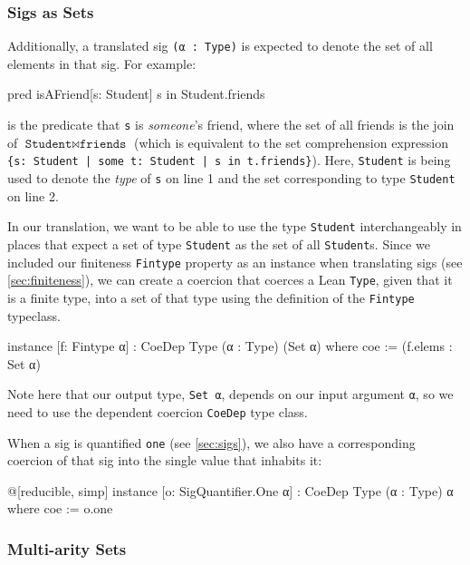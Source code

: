 \subsubsection{Sigs as Sets}

Additionally, a translated sig \texttt{(α : Type)} is expected to denote the set of all elements in that sig. For example:
\begin{forge}
pred isAFriend[s: Student] {
  s in Student.friends
}
\end{forge}
is the predicate that \texttt{s} is \emph{someone}'s friend, where the set of all friends is the join of $\texttt{Student} \bowtie \texttt{friends}$ (which is equivalent to the set comprehension expression \texttt{\{s: Student | some t: Student | s in t.friends\}}). Here, \texttt{Student} is being used to denote the \emph{type} of \texttt{s} on line 1 and the set corresponding to type \texttt{Student} on line 2. 

In our translation, we want to be able to use the type \texttt{Student} interchangeably in places that expect a set of type \texttt{Student} as the set of all \texttt{Student}s. Since we included our finiteness \texttt{Fintype} property as an instance when translating sigs (see \cref{sec:finiteness}), we can create a coercion that coerces a Lean \texttt{Type}, given that it is a finite type, into a set of that type using the definition of the \texttt{Fintype} typeclass. 
\begin{leanimpl*}
instance [f: Fintype α] : CoeDep Type (α : Type) (Set α) where
  coe := (f.elems : Set α)
\end{leanimpl*}
Note here that our output type, \texttt{Set α}, depends on our input argument \texttt{α}, so we need to use the dependent coercion \texttt{CoeDep} type class. 

When a sig is quantified \texttt{one} (see \cref{sec:sigs}), we also have a corresponding coercion of that sig into the single value that inhabits it: 
\begin{leanimpl*}
@[reducible, simp] instance [o: SigQuantifier.One α] : CoeDep Type (α : Type) α where
  coe := o.one
\end{leanimpl*}

\subsubsection{Multi-arity Sets}

